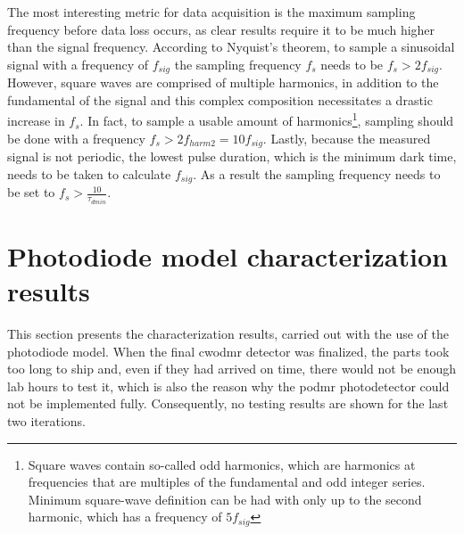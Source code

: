 The most interesting metric for data acquisition is the maximum sampling frequency before data loss occurs, as clear results require it to be much higher than the signal frequency. According to Nyquist's theorem, to sample a sinusoidal signal with a frequency of $f_{sig}$ the sampling frequency $f_s$ needs to be $f_s > 2f_{sig}$. However, square waves are comprised of multiple harmonics, in addition to the fundamental of the signal and this complex composition necessitates a drastic increase in $f_s$. In fact, to sample a usable amount of harmonics\footnote{Square waves contain so-called odd harmonics, which are harmonics at frequencies that are multiples of the fundamental and odd integer series. Minimum square-wave definition can be had with only up to the second harmonic, which has a frequency of $5f_{sig}$}, sampling should be done with a frequency $f_s > 2f_{harm2} = 10f_{sig}$. Lastly, because the measured signal is not periodic, the lowest pulse duration, which is the minimum dark time, needs to be taken to calculate $f_{sig}$. As a result the sampling frequency needs to be set to $f_s > \frac{10}{\tau_{dmin}}$.



\section{Photodiode model characterization results}\label{chap:test:pdmodel}
This section presents the characterization results, carried out with the use of the photodiode model. When the final \gls{cwodmr} detector was finalized, the parts took too long to ship and, even if they had arrived on time, there would not be enough lab hours to test it, which is also the reason why the \gls{podmr} photodetector could not be implemented fully. Consequently, no testing results are shown for the last two iterations.

